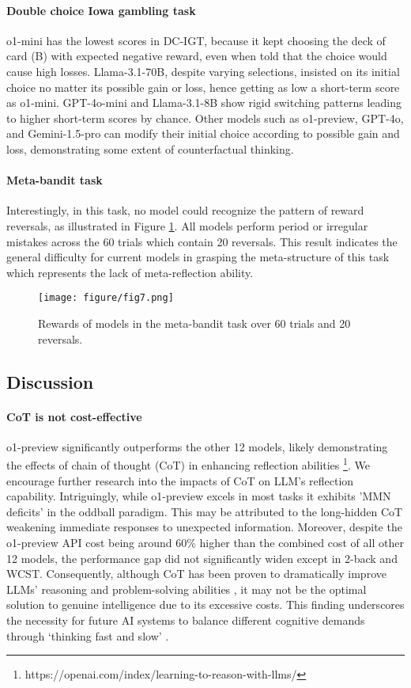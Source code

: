 \paragraph{Double choice Iowa gambling task} o1-mini has the lowest scores in DC-IGT, because it kept choosing the deck of card (B) with expected negative reward, even when told that the choice would cause high losses. Llama-3.1-70B, despite varying selections, insisted on its initial choice no matter its possible gain or loss, hence getting as low a short-term score as o1-mini. GPT-4o-mini and Llama-3.1-8B show rigid switching patterns leading to higher short-term scores by chance. Other models such as o1-preview, GPT-4o, and Gemini-1.5-pro can modify their initial choice according to possible gain and loss, demonstrating some extent of counterfactual thinking.

\paragraph{Meta-bandit task} Interestingly, in this task, no model could recognize the pattern of reward reversals, as illustrated in Figure \ref{fig7}. All models perform period or irregular mistakes across the 60 trials which contain 20 reversals. This result indicates the general difficulty for current models in grasping the meta-structure of this task which represents the lack of meta-reflection ability.
\begin{figure}
    \centering
    \texttt{[image: figure/fig7.png]}
    \caption{Rewards of models in the meta-bandit task over 60 trials and 20 reversals.}
    \label{fig7}
\end{figure}
\subsection{Discussion}
\paragraph{CoT is not cost-effective} o1-preview significantly outperforms the other 12 models, likely demonstrating the effects of chain of thought (CoT) in enhancing reflection abilities \footnote{https://openai.com/index/learning-to-reason-with-llms/}. We encourage further research into the impacts of CoT on LLM's reflection capability. Intriguingly, while o1-preview excels in most tasks it exhibits 'MMN deficits' in the oddball paradigm. This may be attributed to the long-hidden CoT weakening immediate responses to unexpected information. Moreover, despite the o1-preview API cost being around 60\% higher than the combined cost of all other 12 models, the performance gap did not significantly widen except in 2-back and WCST. Consequently, although CoT has been proven to dramatically improve LLMs' reasoning and problem-solving abilities \cite{prabhakar2024decipheringfactorsinfluencingefficacy,li2024chainthoughtempowerstransformers}, it may not be the optimal solution to genuine intelligence due to its excessive costs. This finding underscores the necessity for future AI systems to balance different cognitive demands through `thinking fast and slow' \cite{kahneman2011thinking}. 

